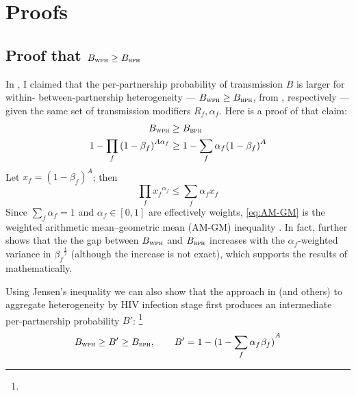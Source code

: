 \section{Proofs}\label{app.foi.proof}
\subsection{Proof that $B_{\textsc{wph}} \ge B_{\textsc{bph}}$}\label{app.foi.proof.xph}
In , I claimed that
the per-partnership probability of transmission $B$ is larger for
within- \vs between-partnership heterogeneity
--- $B_{\textsc{wph}} \ge B_{\textsc{bph}}$, from , respectively ---
given the same set of transmission modifiers $R_f, \alpha_f$.
Here is a proof of that claim:
\begin{equation}
  \begin{aligned}
    B_{\textsc{wph}} &\ge B_{\textsc{bph}} \\
    1 - \prod_f {(1 - \beta_f)}^{A\alpha_f} &\ge 1 - \sum_f \alpha_f {(1 - \beta_f)}^{A}
  \end{aligned}
\end{equation}
Let $x_f = {(1 - \beta_f)}^A$; then
\begin{equation}\label{eq:AM-GM}
  \prod_f {x_f}^{\alpha_f} \le \sum_f \alpha_f x_f
\end{equation}
Since $\sum_f \alpha_f = 1$ and $\alpha_f \in [0,1]$ are effectively weights,
\eqref{eq:AM-GM} is the weighted arithmetic mean--geometric mean (AM-GM) inequality \cite{Aldaz2009}.
In fact, \citet{Aldaz2009} further shows that the the gap between $B_{\textsc{wph}}$ and $B_{\textsc{bph}}$
increases with the $\alpha_f$-weighted variance in ${\beta_f}^{\frac12}$
(although the increase is not exact),
which supports the results of  mathematically.
\par
Using Jensen's inequality \cite{Jensen1906} we can also show that
the approach in \cite{Kerr2015} (and others)
to aggregate heterogeneity by HIV infection stage first
produces an intermediate per-partnership probability $B'$:%
\footnote{}
\begin{equation}
  B_{\textsc{wph}} \ge B' \ge B_{\textsc{bph}},
  \qquad B' = 1 - {(1 - \sum_f \alpha_f \beta_f)}^{A}
\end{equation}
